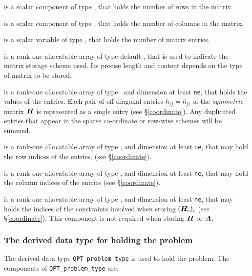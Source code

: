 \documentclass{galahad}
\begin{document}
\begin{description}

 is a scalar component of type \integer,
that holds the number of rows in the matrix.

 is a scalar component of type \integer,
that holds the number of columns in the matrix.

 is a scalar variable of type \integer, that
holds the number of matrix entries.

 is a rank-one allocatable array of type default \character, that
is used to indicate the matrix storage scheme used. Its precise length and
content depends on the type of matrix to be stored.

 is a rank-one allocatable array of type \realdp\,
and dimension at least {\tt ne}, that holds the values of the entries.
Each pair of off-diagonal entries $h_{ij} = h_{ji}$ of the {\em symmetric}
matrix ${\bm{H}}$ is represented as a single entry
(see \S\ref{coordinate}).
Any duplicated entries that appear in the sparse
co-ordinate or row-wise schemes will be summed.

 is a rank-one allocatable array of type \integer,
and dimension at least {\tt ne}, that may hold the row indices of the entries.
(see \S\ref{coordinate}).

 is a rank-one allocatable array of type \integer,
and dimension at least {\tt ne}, that may hold the column indices of the entries
(see \S\ref{coordinate}).

 is a rank-one allocatable array of type \integer,
and dimension at least {\tt ne}, that may holds the indices of the
constraints involved when storing $({\bm{H}}_c)_i$
(see \S\ref{coordinate}).
This component is not required when storing ${\bm{H}}$ or ${\bm{A}}$.

\end{description}


\subsubsection{The derived data type for holding the problem}\label{typeprob}
The derived data type {\tt QPT\_problem\_type} is used to hold
the problem. The components of
{\tt QPT\_problem\_type}
are:
\end{document}
